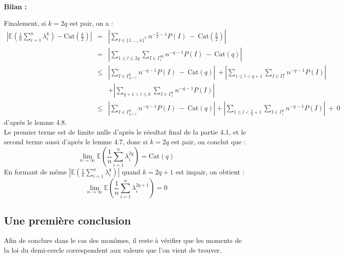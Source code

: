 \documentclass[10pt,a4paper]{article}
\begin{document}
\textbf{Bilan :}

 Finalement, si $k=2q$ est pair, on a :
 \begin{eqnarray*}
 \left | \mathbb{E}(\frac{1}{n} \sum_{i=1}^n \lambda_i^k) - \text{Cat}(\frac{k}{2})\right |&=&\left |\sum_{I \in \{1,\dots,n\}^k} n^{-\frac{k}{2}-1}P(I) \ - \ \text{Cat}(\frac{k}{2}) \right |\\
&=&\left |\sum_{1 \leq l \leq 2q}\sum_{I \in \Gamma^{2q}_{l} } n^{-q-1}P(I) \ - \ \text{Cat}(q)\right |\\
&\leq& \left |\sum_{I \in \Gamma^{k}_{q+1} } n^{-q-1}P(I) \ - \ \text{Cat}(q)\right | \ + \left |\sum_{ 1 \leq l <q + 1 }\sum_{I \in \Gamma^{k}_{l} } n^{-q-1}P(I)\right |\\
&&+\left |\sum_{ q + 1 < l \leq k }\sum_{I \in \Gamma^{k}_{l} } n^{-q-1}P(I)\right |\\
&\leq& \left |\sum_{I \in \Gamma^{k}_{q+1} } n^{-q-1}P(I) \ - \ \text{Cat}(q)\right | +\left |\sum_{ 1 \leq l < \frac{k}{2} + 1 }\sum_{I \in \Gamma^{k}_{l} } n^{-q-1}P(I)\right | \ + \ 0 \end{eqnarray*}
d'après le lemme 4.8.\\
Le premier terme est de limite nulle d'après le résultat final de la partie 4.1, et le second terme aussi d'après le lemme 4.7, donc si $k=2q$ est pair, on conclut que : 
 \[ \lim_{n \to \infty} \mathbb{E}\left (\frac{1}{n} \sum_{i=1}^n \lambda_i^{2q}\right ) = \text{Cat}(q) \]
 En formant de même $| \mathbb{E}(\frac{1}{n} \sum_{i=1}^n \lambda_i^k)|$ quand $k=2q+1$ est impair, on obtient :
  \[ \lim_{n \to \infty} \mathbb{E}\left (\frac{1}{n} \sum_{i=1}^n \lambda_i^{2q+1}\right ) = 0 \]
  
  \subsection{Une première conclusion}
  Afin de conclure dans le cas des monômes, il reste à vérifier que les moments de la loi du demi-cercle correspondent aux valeurs que l'on vient de trouver.\\
  
\end{document}
